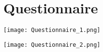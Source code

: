 \chapter{Questionnaire}


% 
\vspace{-1.8cm}
\texttt{[image: Questionnaire\_1.png]}

\texttt{[image: Questionnaire\_2.png]}
% 
